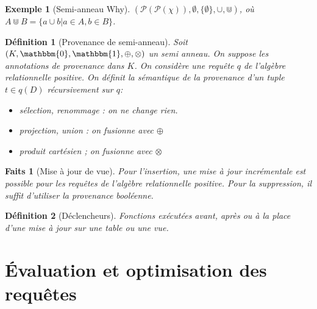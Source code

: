 \documentclass[landscape]{article}
\renewcommand{\P}{\mathscr{P}}
\newcommand{\1}{\mathbbm{1}}
\newcommand{\0}{\mathbbm{0}}
\newtheorem{defi}{Définition}
\newtheorem{fact}{Faits}
\newtheorem{ex}{Exemple}
\begin{document}
\begin{multicols}{2}
    \begin{ex}[Semi-anneau Why]
        $(\P(\P(\chi)), \emptyset, \{\emptyset\}, \cup, \Cup)$, où
        $A\Cup B = \{a\cup b | a\in A, b\in B\}$.
    \end{ex}

    \begin{defi}[Provenance de semi-anneau]
        Soit $(K, \0, \1, \oplus, \otimes)$ un semi anneau. On suppose les annotations
        de provenance dans $K$. On considère une requête $q$ de l'algèbre relationnelle
        positive. On définit la sémantique de la provenance d'un tuple $t\in q(D)$
        récursivement sur $q$: \begin{itemize}
            \item sélection, renommage : on ne change rien.
            \item projection, union : on fusionne avec $\oplus$
            \item produit cartésien ; on fusionne avec $\otimes$
        \end{itemize}
    \end{defi}

    \begin{fact}[Mise à jour de vue] Pour l'insertion, une mise à jour incrémentale
        est possible pour les requêtes de l'algèbre relationnelle positive. Pour
        la suppression, il suffit d'utiliser la provenance booléenne.
    \end{fact}
    
    \begin{defi}[Déclencheurs]
        Fonctions exécutées avant, après ou à la place d'une mise à jour sur une
        table ou une vue.
    \end{defi}

    \section{Évaluation et optimisation des requêtes}

\end{multicols}
\end{document}
